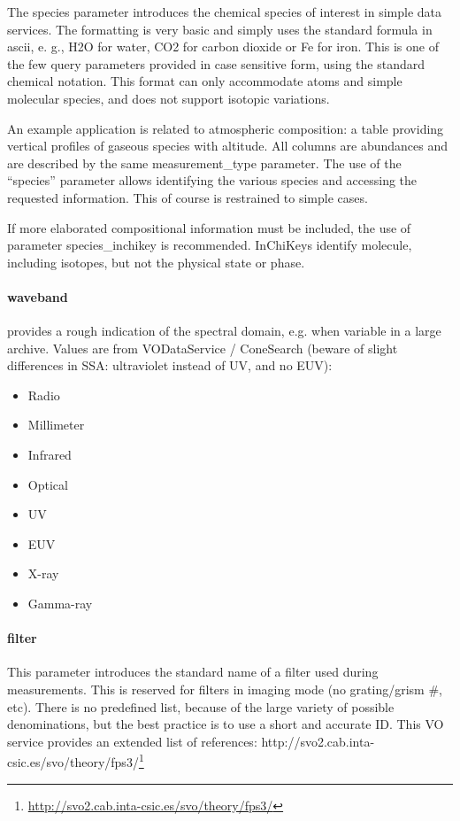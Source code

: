 \documentclass[11pt,a4paper]{ivoa}
\begin{document}
The species parameter introduces the chemical species of interest in simple data services. The formatting is very basic and simply uses the standard formula in ascii, e. g., H2O for water, CO2 for carbon dioxide or Fe for iron. This is one of the few query parameters provided in case sensitive form, using the standard chemical notation. This format can only accommodate atoms and simple molecular species, and does not support isotopic variations.  

An example application is related to atmospheric composition: a table providing vertical profiles of gaseous species with altitude. All columns are abundances and are described by the same measurement\_type parameter. The use of the ``species'' parameter allows identifying the various species and accessing the requested information. This of course is restrained to simple cases.

If more elaborated compositional information must be included, the use of parameter species\_inchikey is recommended. InChiKeys identify molecule, including isotopes, but not the physical state or phase.\\

\paragraph{waveband}

provides a rough indication of the spectral domain, e.g. when variable in a large archive. Values are from VODataService / ConeSearch (beware of slight differences in SSA: ultraviolet instead of UV, and no EUV): 

\begin{itemize}
\item Radio
\item Millimeter
\item Infrared
\item Optical
\item UV
\item EUV
\item X-ray
\item Gamma-ray
\end{itemize}

\paragraph{filter}

This parameter introduces the standard name of a filter used during measurements. This is reserved for filters in imaging mode (no grating/grism \#, etc). There is no predefined list, because of the large variety of possible denominations, but the best practice is to use a short and accurate ID. This VO service provides an extended list of references: http://svo2.cab.inta-csic.es/svo/theory/fps3/\footnote{\url{http://svo2.cab.inta-csic.es/svo/theory/fps3/}}
\end{document}
